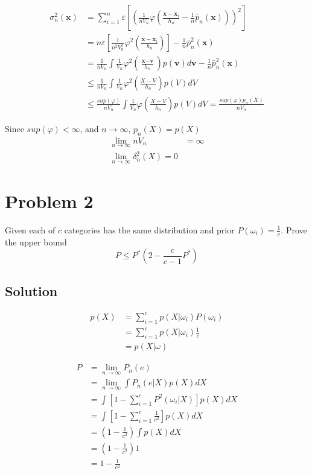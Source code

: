 \documentclass{IEEEtran}
\begin{document}
\begin{align*}
    \sigma_n^2(\textbf{x}) &= \sum_{i=1}^n \varepsilon \left[ \left( \frac{1}{nV_n} \varphi \left( \frac{\textbf{x} - \textbf{x}_i}{h_n} - \frac{1}{n} \bar{p}_n(\textbf{x}) \right) \right)^2 \right] \\
    &= n \varepsilon \left[ \frac{1}{n^2 V_n^2} \varphi^2 \left( \frac{\textbf{x} - \textbf{x}_i}{h_n} \right) \right] - \frac{1}{n} \bar{p}_n^2(\textbf{x}) \\
    &= \frac{1}{n V_n} \int \frac{1}{V_n} \varphi^2 \left( \frac{\textbf{x} - \textbf{v}}{h_n} \right) p(\textbf{v}) d\textbf{v} - \frac{1}{n} \bar{p}_n^2(\textbf{x}) \\
    &\le \frac{1}{n V_n} \int \frac{1}{V_n} \varphi^2 \left( \frac{X - V}{h_n} \right) p(V) dV \\
    &\le \frac{sup(\varphi)}{n V_n} \int \frac{1}{V_n} \varphi \left( \frac{X - V}{h_n} \right) p(V) dV = \frac{sup(\varphi) \overline{p_n(X)}}{n V_n}
\end{align*}

Since \(sup(\varphi) < \infty\), and \(n \to \infty\), \(\overline{p_n(X)} = p(X)\)
\begin{align*}
    \lim_{n \to \infty} n V_n &= \infty \\
    \lim_{n \to \infty} \delta_n^2(X) = 0
\end{align*}

\newpage

\section{Problem 2} %
Given each of \(c\) categories has the same distribution and prior \(P(\omega_i) = \frac{1}{c}\).
Prove the upper bound \[P \le P^*\left( 2 - \frac{c}{c - 1}P^*\right)\]

\subsection{Solution}
\begin{align*}
    p(X) &= \sum_{i=1}^c p\left(X|\omega_i\right) P\left(\omega_i\right) \\
    &= \sum_{i=1}^c p\left(X|\omega_i\right) \frac{1}{c} \\
    &= p(X|\omega)
\end{align*}

\begin{align*}
    P &= \lim_{n \to \infty} P_n(e) \\
    &= \lim_{n \to \infty} \int P_n(e|X) p(X) dX \\
    &= \int \left[ 1 - \sum_{i=1}^c P^2\left(\omega_i|X\right) \right] p(X) dX \\
    &= \int \left[ 1 - \sum_{i=1}^c \frac{1}{c^2} \right] p(X) dX \\
    &= \left( 1 - \frac{1}{c^2} \right) \int p(X) dX \\
    &= \left( 1 - \frac{1}{c^2} \right) 1 \\
    &= 1 - \frac{1}{c^2}
\end{align*}
\end{document}
